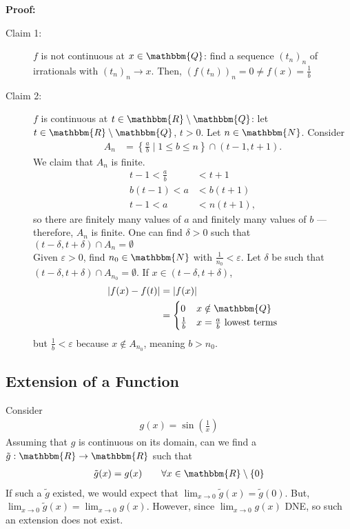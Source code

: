 \documentclass[10pt]{extarticle}
\newcommand{\N}{\mathbbm{N}}
\newcommand{\Q}{\mathbbm{Q}}
\newcommand{\R}{\mathbbm{R}}
\begin{document}
    \textbf{Proof:}
    \begin{description}
      \item[Claim 1:] $f$ is not continuous at $x\in\Q$: find a sequence $(t_n)_n$ of irrationals with $(t_n)_n \rightarrow x$. Then, $(f(t_n))_n = 0\neq f(x) = \frac{1}{b}$
      \item[Claim 2:] $f$ is continuous at $t\in \R\setminus\Q$: let $t\in \R\setminus\Q$, $t > 0$. Let $n\in\N$. Consider
        \begin{align*}
          A_n &= \left\{\frac{a}{b} \mid 1 \leq b\leq n\right\} \cap (t-1,t+1).
        \end{align*}
        We claim that $A_n$ is finite.
        \begin{align*}
          t-1 < \frac{a}{b} &< t+1\\
          b(t-1) < a &< b(t+1)\\
          t-1 < a &< n(t+1),
        \end{align*}
        so there are finitely many values of $a$ and finitely many values of $b$ --- therefore, $A_n$ is finite. One can find $\delta > 0$ such that $(t-\delta,t+\delta) \cap A_n = \emptyset$\\

        Given $\varepsilon > 0$, find $n_{0}\in \N$ with $\frac{1}{n_0} < \varepsilon$. Let $\delta$ be such that $(t-\delta,t+\delta) \cap A_{n_0} = \emptyset$. If $x\in (t-\delta,t+\delta)$,
        \begin{align*}
          |f(x) - f(t)| &= |f(x)|\\
                        &= \begin{cases}
                          0 & x\notin\Q\\
                          \frac{1}{b} & x = \frac{a}{b}~\text{lowest terms}
                        \end{cases}
        \end{align*}
        but $\frac{1}{b} < \varepsilon$ because $x\notin A_{n_0}$, meaning $b > n_0$.
    \end{description}
  \subsection{Extension of a Function}%
    Consider
    \begin{align*}
      g(x) = \sin\left(\frac{1}{x}\right) \tag*{$x\neq 0$}
    \end{align*}
    Assuming that $g$ is continuous on its domain, can we find a $\tilde{g}: \R\rightarrow\R$ such that
    \begin{align*}
      \tilde{g}(x) = g(x) \tag*{$\forall x\in\R\setminus\{0\}$}
    \end{align*}
    If such a $\tilde{g}$ existed, we would expect that $\lim_{x\rightarrow 0}\tilde{g}(x) = \tilde{g}(0)$. But, $\lim_{x\rightarrow 0}\tilde{g}(x) = \lim_{x\rightarrow 0}g(x)$. However, since $\lim_{x\rightarrow 0}g(x)$ DNE, so such an extension does not exist.\\
\end{document}
